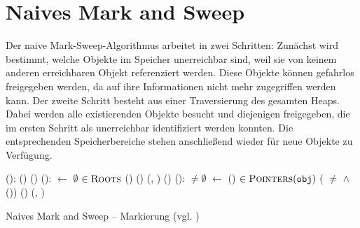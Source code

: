 \section{Naives Mark and Sweep}
\label{sec:naive-mark-sweep}
Der naive Mark-Sweep-Algorithmus arbeitet in zwei Schritten:
Zunächst wird bestimmt, welche Objekte im Speicher unerreichbar sind, weil sie von keinem anderen erreichbaren Objekt referenziert werden.
Diese Objekte können gefahrlos freigegeben werden, da auf ihre Informationen nicht mehr zugegriffen werden kann.
Der zweite Schritt besteht aus einer Traversierung des gesamten Heaps.
Dabei werden alle existierenden Objekte besucht und diejenigen freigegeben, die im ersten Schritt als unerreichbar identifiziert werden konnten.
Die entsprechenden Speicherbereiche stehen anschließend wieder für neue Objekte zu Verfügung.

\begin{algorithm}
\begin{algorithmic}[1]
	\State {}():
	\State \quad {}()
	\State \quad {}()
	\Statex
	\State {}():
	\State \quad {} $\gets$ $\emptyset$				
	\State \quad \FOREACH {} $\in \textsc{Roots}$		
	\State \quad \quad \IF {}()
	\State \quad \quad \quad {}()	
	\State \quad \quad \quad {}(, )	
	\State \quad \quad \quad {}()			
	\Statex
	\State {}():
	\State \quad \WHILE {} $\neq \emptyset$
	\State \quad \quad {} $\gets$ ()			
	\State \quad \quad \FOREACH {} $\in \textsc{Pointers}(\texttt{obj})$	
	\State \quad \quad \quad \IF ( $\neq$ \Null $\wedge$ ())	
	\State \quad \quad \quad \quad {}()	
	\State \quad \quad \quad \quad {}(, )
\end{algorithmic}
\caption[Naives Mark and Sweep -- Markierung]{Naives Mark and Sweep -- Markierung (vgl. \cite[Kap. 2.2]{jones-lins})}
\label{algo:naive-mark}
\end{algorithm}

